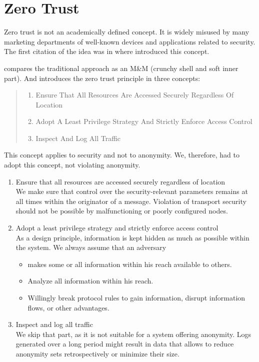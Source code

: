 \section{Zero Trust}\label{sec:zeroTrust}
Zero trust is not an academically defined concept. It is widely misused by many marketing departments of well-known devices and applications related to security. The first citation of the idea was in \cite{kindervag2010no} where \citeauthor{kindervag2010no} introduced this concept.

\citeauthor{kindervag2010no} compares the traditional approach as an M\&M (crunchy shell and soft inner part). And introduces the zero trust principle in three concepts:
\begin{quote}
	\begin{enumerate}
		\item Ensure That All Resources Are Accessed Securely Regardless Of Location
		\item Adopt A Least Privilege Strategy And Strictly Enforce Access Control
		\item Inspect And Log All Traffic
	\end{enumerate}
\end{quote}

This concept applies to security and not to anonymity. We, therefore, had to adopt this concept, not violating anonymity.
\begin{enumerate}
	\item Ensure that all resources are accessed securely regardless of location\\
	We make sure that control over the security-relevant parameters remains at all times within the originator of a message. Violation of transport security should not be possible by malfunctioning or poorly configured nodes.
	\item Adopt a least privilege strategy and strictly enforce access control\\
	As a design principle, information is kept hidden as much as possible within the system. We always assume that an adversary
	\begin{itemize}
		\item makes some or all information within his reach available to others.
		\item Analyze all information within his reach.
		\item Willingly break protocol rules to gain information, disrupt information flows, or other advantages.
	\end{itemize}		
	\item Inspect and log all traffic\\
	We skip that part, as it is not suitable for a system offering anonymity. Logs generated over a long period might result in data that allows to reduce anonymity sets retrospectively or minimize their size.
	
\end{enumerate}

